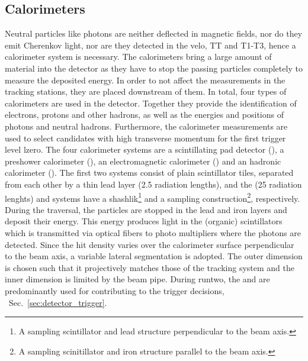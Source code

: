 \subsection{Calorimeters}
Neutral particles like photons are neither deflected in magnetic fields, nor do they emit Cherenkov light, nor are they detected in the \gls{velo}, TT and T1-T3, hence a calorimeter system is necessary.
The calorimeters bring a large amount of material into the detector as they have to stop the passing particles completely to measure the deposited energy.
In order to not affect the measurements in the tracking stations, they are placed downstream of them.
In total, four types of calorimeters are used in the \lhcb detector.
Together they provide the identification of electrons, protons and other hadrons, as well as the energies and positions of photons and neutral hadrons.
Furthermore, the calorimeter measurements are used to select candidates with high transverse momentum for the first trigger level \gls{lzero}.
The four calorimeter systems are a scintillating pad detector (\spd), a preshower calorimeter (\presh), an electromagnetic calorimeter (\ecal) and an hadronic calorimeter (\hcal).
The first two systems consist of plain scintillator tiles, separated from each other by a thin lead layer (2.5 radiation lengths), and the \ecal (25 radiation lenghts) and \hcal systems have a shashlik\footnote{A sampling scintillator and lead structure perpendicular to the beam axis.} and a sampling construction\footnote{A sampling scinitillator and iron structure parallel to the beam axis.}, respectively.
During the traversal, the particles are stopped in the lead and iron layers and deposit their energy.
This energy produces light in the (organic) scintillators which is transmitted via optical fibers to photo multipliers where the photons are detected.
Since the hit density varies over the calorimeter surface perpendicular to the beam axis, a variable lateral segmentation is adopted.
The outer dimension is chosen such that it projectively matches those of the tracking system and the inner dimension is limited by the beam pipe.
During \gls{runtwo}, the \ecal and \hcal are predominantly used for contributing to the trigger decisions, \cf{}~Sec.~\ref{sec:detector_trigger}.

